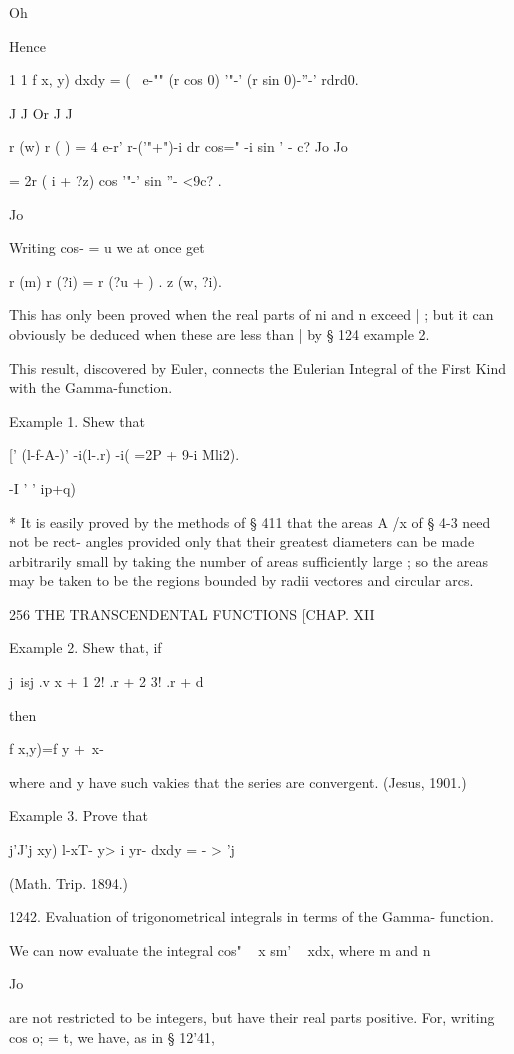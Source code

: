 Oh

Hence

1 1 f x, y) dxdy = ( \ e-"" (r cos 0) '"-' (r sin 0)-''-' rdrd0.

J J Or J J

r (w) r ( ) = 4 e-r' r-('"+")-i dr cos=" -i sin ' - c? Jo Jo

= 2r ( i + ?z) cos '"-' sin ''- <9c? .

Jo

Writing cos- = u we at once get

r (m) r (?i) = r (?u + ) . z (w, ?i).

This has only been proved when the real parts of ni and n exceed | ;
but it can obviously be deduced when these are less than | by § 124
example 2.

This result, discovered by Euler, connects the Eulerian Integral of
the First Kind with the Gamma-function.

Example 1. Shew that

[' (l-f-A-)' -i(l-.r) -i( =2P + 9-i Mli2).

  -I ' ' ip+q)

* It is easily proved by the methods of § 411 that the areas A /x of §
4-3 need not be rect- angles provided only that their greatest
diameters can be made arbitrarily small by taking the number of areas
sufficiently large ; so the areas may be taken to be the regions
bounded by radii vectores and circular arcs.

256 THE TRANSCENDENTAL FUNCTIONS [CHAP. XII

Example 2. Shew that, if

j\ isj .v x + 1 2! .r + 2 3! .r + d

then

f x,y)=f y + \,x-\ \

where and y have such vakies that the series are convergent. (Jesus,
1901.)

Example 3. Prove that

j'J'j xy) l-xT- y> i yr- dxdy = - > 'j

(Math. Trip. 1894.)

1242. Evaluation of trigonometrical integrals in terms of the Gamma-
function.

We can now evaluate the integral cos" ~ x sm' ~ xdx, where m and n

Jo

are not restricted to be integers, but have their real parts positive.
For, writing cos o; = t, we have, as in § 12'41,

